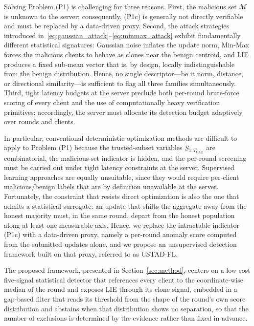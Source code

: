 \documentclass[journal]{IEEEtran}
\begin{document}
Solving Problem (P1) is challenging for three reasons. First, the malicious set $\mathcal{M}$ is unknown to the server; consequently, (P1c) is generally not directly verifiable and must be replaced by a data-driven proxy. Second, the attack strategies introduced in~\eqref{eq:gaussian_attack}--\eqref{eq:minmax_attack} exhibit fundamentally different statistical signatures: Gaussian noise inflates the update norm, Min-Max forces the malicious clients to behave as clones near the benign centroid, and LIE produces a fixed sub-mean vector that is, by design, locally indistinguishable from the benign distribution. Hence, no single descriptor—be it norm, distance, or directional similarity—is sufficient to flag all three families simultaneously. Third, tight latency budgets at the server preclude both per-round brute-force scoring of every client and the use of computationally heavy verification primitives; accordingly, the server must allocate its detection budget adaptively over rounds and clients.

In particular, conventional deterministic optimization methods are difficult to apply to Problem (P1) because the trusted-subset variables $\widetilde{S}_{1:T_{\text{total}}}$ are combinatorial, the malicious-set indicator is hidden, and the per-round screening must be carried out under tight latency constraints at the server. Supervised learning approaches are equally unsuitable, since they would require per-client malicious/benign labels that are by definition unavailable at the server. Fortunately, the constraint that resists direct optimization is also the one that admits a statistical surrogate: an update that shifts the aggregate away from the honest majority must, in the same round, depart from the honest population along at least one measurable axis. Hence, we replace the intractable indicator (P1c) with a data-driven proxy, namely a per-round anomaly score computed from the submitted updates alone, and we propose an unsupervised detection framework built on that proxy, referred to as USTAD-FL.

The proposed framework, presented in Section~\ref{sec:method}, centers on a low-cost five-signal statistical detector that references every client to the coordinate-wise median of the round and exposes LIE through its clone signal, embedded in a gap-based filter that reads its threshold from the shape of the round's own score distribution and abstains when that distribution shows no separation, so that the number of exclusions is determined by the evidence rather than fixed in advance.
\end{document}
